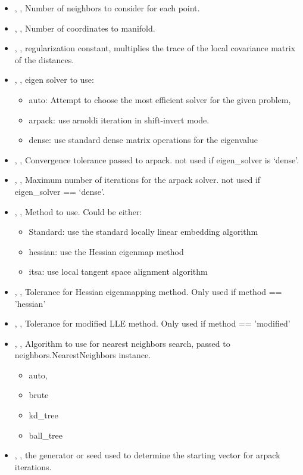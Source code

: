 \begin{itemize}
	\item {}, , Number of neighbors to
	consider for each point. 
	\item {}, , Number of coordinates to
	 manifold. 
	\item {}, , regularization constant, multiplies
	the trace of the local covariance matrix of the distances. 
	\item {}, , eigen solver to use:
	\begin{itemize}
		\item auto: Attempt to choose the most efficient solver for the given problem,
		\item arpack: use arnoldi iteration in shift-invert mode.
		\item dense: use standard dense matrix operations for the eigenvalue
	\end{itemize}
	\item {}, , Convergence tolerance passed to arpack.
	 not used if eigen\_solver is ‘dense’. 
	\item {}, , Maximum number of iterations for the
	 arpack solver. not used if eigen\_solver == ‘dense’. 
	\item {}, , Method to use. Could be either:
	\begin{itemize}
		\item Standard: use the standard locally linear embedding algorithm
		\item hessian: use the Hessian eigenmap method
		\item itsa: use local tangent space alignment algorithm
	\end{itemize}
	\item {}, , Tolerance for Hessian eigenmapping
	 method. Only used if method == 'hessian' 
	\item {}, , Tolerance for modified LLE method.
	 Only used if method == 'modified' 
	\item {}, , Algorithm to use for nearest
	 neighbors search, passed to neighbors.NearestNeighbors instance.
	\begin{itemize}
		\item auto,
		\item brute
		\item kd\_tree
		\item ball\_tree
	\end{itemize}
	\item {}, , the generator
	or seed used to determine the starting vector for arpack iterations. 
\end{itemize}
